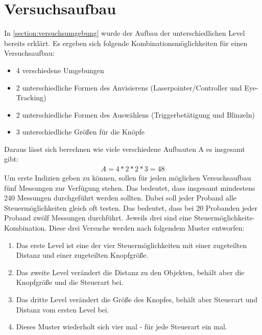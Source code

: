 \section{Versuchsaufbau} 
In \autoref{section:versuchsumgebung} wurde der Aufbau der unterschiedlichen Level bereits erklärt. Es ergeben sich folgende Kombinationsmöglichkeiten für einen Versuchsaufbau:
\begin{itemize}
	\item 4 verschiedene Umgebungen
	\item 2 unterschiedliche Formen des Anvisierens (Laserpointer/Controller und Eye-Tracking)
	\item 2 unterschiedliche Formen des Auswählens (Triggerbetätigung und Blinzeln)
	\item 3 unterschiedliche Größen für die Knöpfe
\end{itemize}
Daraus lässt sich berechnen wie viele verschiedene Aufbauten A es insgesamt gibt:
\begin{align}
	A=4*2*2*3=48
\end{align}
Um erste Indizien geben zu können, sollen für jeden möglichen Versuchsaufbau fünf Messungen zur Verfügung stehen. Das bedeutet, dass insgesamt mindestens 240 Messungen durchgeführt werden sollten. Dabei soll jeder Proband alle Steuermöglichkeiten gleich oft testen. Das bedeutet, dass bei 20 Probanden jeder Proband zwölf Messungen durchführt. Jeweils drei sind eine Steuermöglichkeits-Kombination. Diese drei Versuche werden nach folgendem Muster entworfen:
\begin{enumerate}
	\item Das erste Level ist eine der vier Steuermöglichkeiten mit einer zugeteilten Distanz und einer zugeteilten Knopfgröße.
	\item Das zweite Level verändert die Distanz zu den Objekten, behält aber die Knopfgröße und die Steuerart bei.
	\item Das dritte Level verändert die Größe des Knopfes, behält aber Steuerart und Distanz vom ersten Level bei.
	\item Dieses Muster wiederholt sich vier mal - für jede Steuerart ein mal.
\end{enumerate}
